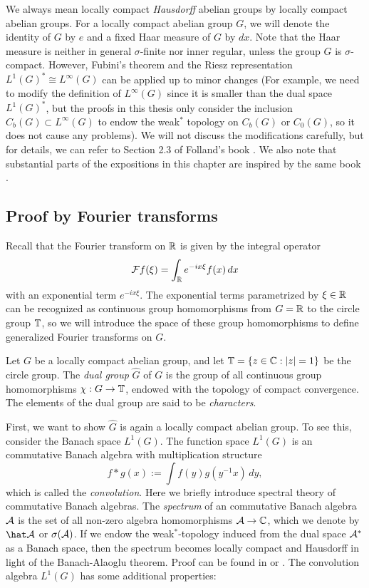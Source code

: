 \documentclass{../../small}
\begin{document}
We always mean locally compact \emph{Hausdorff} abelian groups by locally compact abelian groups.
For a locally compact abelian group $G$, we will denote the identity of $G$ by $e$ and a fixed Haar measure of $G$ by $dx$.
Note that the Haar measure is neither in general $\sigma$-finite nor inner regular, unless the group $G$ is $\sigma$-compact.
However, Fubini's theorem and the Riesz representation $L^1(G)^*\cong L^\infty(G)$ can be applied up to minor changes (For example, we need to modify the definition of $L^\infty(G)$ since it is smaller than the dual space $L^1(G)^*$, but the proofs in this thesis only consider the inclusion $C_b(G)\subset L^\infty(G)$ to endow the weak$^*$ topology on $C_b(G)$ or $C_0(G)$, so it does not cause any problems).
We will not discuss the modifications carefully, but for details, we can refer to Section 2.3 of Folland's book \cite{folland2016course}.
We also note that substantial parts of the expositions in this chapter are inspired by the same book \cite{folland2016course}.

\subsection{Proof by Fourier transforms}

Recall that the Fourier transform on $\mathbb{R}$ is given by the integral operator
\[\mathcal{F} f(\xi)=\int_{\mathbb{R}} e^{-ix\xi}f(x)\,dx\]
with an exponential term $e^{-ix\xi}$.
The exponential terms parametrized by $\xi\in\mathbb{R}$ can be recognized as continuous group homomorphisms from $G=\mathbb{R}$ to the circle group $\mathbb{T}$, so we will introduce the space of these group homomorphisms to define generalized Fourier transforms on $G$.

\begin{defn}
Let $G$ be a locally compact abelian group, and let $\mathbb{T}=\{z\in\mathbb{C}:|z|=1\}$ be the circle group.
The \emph{dual group} $\hat G$ of $G$ is the group of all continuous group homomorphisms $\chi:G\to\mathbb{T}$, endowed with the topology of compact convergence.
The elements of the dual group are said to be \emph{characters}.
\end{defn}

First, we want to show $\hat G$ is again a locally compact abelian group.
To see this, consider the Banach space $L^1(G)$.
The function space $L^1(G)$ is an commutative Banach algebra with multiplication structure
\[f*g(x):=\int f(y)g(y^{-1}x)\,dy,\]
which is called the \emph{convolution}.
Here we briefly introduce spectral theory of commutative Banach algebras.
The \emph{spectrum} of an commutative Banach algebra $\mathcal{A}$ is the set of all non-zero algebra homomorphisms $\mathcal{A}\to\mathbb{C}$, which we denote by $\hat\cA$ or $\sigma(\mathcal{A})$.
If we endow the weak$^*$-topology induced from the dual space $\mathcal{A}^*$ as a Banach space, then the spectrum becomes locally compact and Hausdorff in light of the Banach-Alaoglu theorem.
Proof can be found in \cite{murphy2014c} or \cite{conway2019course}.
The convolution algebra $L^1(G)$ has some additional properties:
\end{document}
